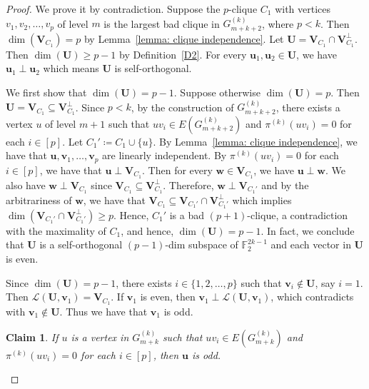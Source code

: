 \documentclass[10pt,a4paper]{amsart}
\newtheorem{claim}{Claim}
\begin{document}
\begin{proof}
    We prove it by contradiction. Suppose the $p$-clique $C_1$ with vertices $v_1,v_2,\ldots, v_p$ of level $m$ is the largest bad clique in $G^{(k)}_{m+k+2}$, where $p<k$.  Then $\dim(\textbf{V}_{C_1})=p$ by Lemma~\ref{lemma: clique independence}.
    Let $\textbf{U}=\textbf{V}_{C_1}\cap \textbf{V}_{C_1}^{\perp}$. Then  $\dim(\textbf{U})\ge p-1$ by Definition~\ref{D2}. For every $\mathbf{u}_1, \mathbf{u}_2\in \textbf{U}$, we have $\mathbf{u}_1\perp \mathbf{u}_2$ which means $\textbf{U}$ is self-orthogonal.

    We first show that $\dim(\textbf{U})= p-1$. 
    Suppose otherwise $\dim(\textbf{U})= p$.
    Then $\textbf{U}=\textbf{V}_{C_1} \subseteq \textbf{V}_{C_1}^{\perp}$. Since $p<k$, by the construction of $G^{(k)}_{m+k+2}$,  there exists a vertex $u$ of level $m+1$ such that $uv_i\in E(G^{(k)}_{m+k+2})$ and $\pi^{(k)}(uv_i)=0$ for each $i\in[p]$. Let  $C_1' \coloneqq {C_1} \cup \{u\}$.
    By Lemma~\ref{lemma: clique independence}, we have that $\mathbf{u}, \mathbf{v}_1, \ldots, \mathbf{v}_p$ are linearly independent.
    By $\pi^{(k)}(uv_i)=0$ for each $i\in[p]$, we have that $\mathbf{u} \perp \textbf{V}_{C_1}$. 
    Then for every $\mathbf{w} \in \textbf{V}_{C_1}$, we have $\mathbf{u} \perp \mathbf{w}$. 
    We also have $\mathbf{w} \perp \textbf{V}_{C_1}$ since $\textbf{V}_{C_1} \subseteq \textbf{V}_{C_1}^{\perp}$.  Therefore, $\mathbf{w} \perp \textbf{V}_{C_1'}$ and by the arbitrariness of $\mathbf{w}$, we have that $\textbf{V}_{C_1} \subseteq \textbf{V}_{C_1'} \cap \textbf{V}_{C_1'}^{\perp}$ which implies $\dim(\textbf{V}_{C_1'} \cap \textbf{V}_{C_1'}^{\perp})\ge p$. Hence, $C_1'$ is a bad $(p+1)$-clique,  a contradiction with the maximality of ${C_1}$, and hence, $\dim(\textbf{U})= p-1$.
    In fact, we conclude that $\textbf{U}$ is a self-orthogonal $(p-1)$-dim subspace of $\mathbb{F}_2^{2k-1}$ and each vector in $\textbf{U}$ is even. 

    Since  $\dim(\textbf{U})= p-1$, there exists $i \in \{1,2,\ldots, p\}$ such that $\mathbf{v}_i \notin \mathbf{U}$, say $i=1$.
   Then $\mathcal{L}(\textbf{U},\textbf{v}_1)=\textbf{V}_{C_1}$.
   If $\mathbf{v}_1$ is even, then $\mathbf{v}_1 \perp \mathcal{L}(\textbf{U},\textbf{v}_1)$, which contradicts with $\mathbf{v}_1 \notin \textbf{U}$. Thus we have that $\textbf{v}_1$ is odd. 

\begin{claim}\label{C zero neighbor is odd}
    If $u$ is a vertex in $G^{(k)}_{m+k}$ such that $uv_i\in E(G^{(k)}_{m+k})$ and $\pi^{(k)}(uv_i)=0$ for each $i\in[p]$, then $\textbf{u}$ is odd.
\end{claim}


\end{proof}
\end{document}
